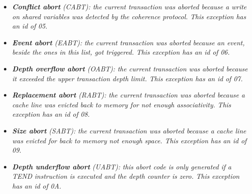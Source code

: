         \begin{itemize}

            \item \textit{\textbf{Conflict abort} (CABT): the current transaction was aborted because a write on shared variables was detected by the coherence protocol. This exception has an id of 05.}

            \item \textit{\textbf{Event abort} (EABT): the current transaction was aborted because an event, beside the ones in this list, got triggered. This exception has an id of 06.}

            \item \textit{\textbf{Depth overflow abort} (OABT): the current transaction was aborted because it exceeded the upper transaction depth limit. This exception has an id of 07.}

            \item \textit{\textbf{Replacement abort} (RABT): the current transaction was aborted because a cache line was evicted back to memory for not enough associativity. This exception has an id of 08.}

            \item \textit{\textbf{Size abort} (SABT): the current transaction was aborted because a cache line was evicted for back to memory not enough space. This exception has an id of 09.}

            \item \textit{\textbf{Depth underflow abort} (UABT): this abort code is only generated if a TEND instruction is executed and the depth counter is zero. This exception has an id of 0A.}

        \end{itemize}

